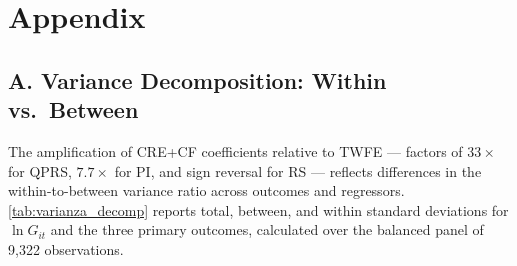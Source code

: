 
\appendix
\section*{Appendix}

\subsection*{A. Variance Decomposition: Within vs.\ Between}
\label{sec:appendix_varianza}

The amplification of CRE+CF coefficients relative to TWFE --- factors of $33\times$ for QPRS, $7.7\times$ for PI, and sign reversal for RS --- reflects differences in the within-to-between variance ratio across outcomes and regressors.
\cref{tab:varianza_decomp} reports total, between, and within standard deviations for $\ln G_{it}$ and the three primary outcomes, calculated over the balanced panel of 9,322 observations.

